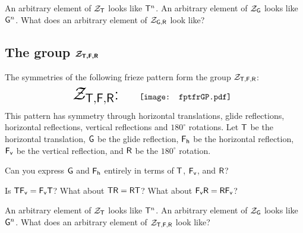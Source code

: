 \documentclass{ximera}
\begin{document}
\begin{question}
An arbitrary element of $\mathcal{Z}_\mathsf{T}$ looks like $\mathsf{T}^n$. An arbitrary
element of $\mathcal{Z}_\mathsf{G}$ looks like $\mathsf{G}^n$. What does an arbitrary element
of $\mathcal{Z}_{\mathsf{G},\mathsf{R}}$ look like?
\end{question}










\subsection{The group $\boldsymbol{\mathcal{Z}_{\mathsf{T},\mathsf{F},\mathsf{R}}}$}

The symmetries of the following frieze pattern form the group $\mathcal{Z}_{\mathsf{T},\mathsf{F},\mathsf{R}}$:
\[
\text{\huge $\Ztfr$:}\qquad\begin{array}{c}
\texttt{[image: fptfrGP.pdf]}
\end{array}
\]
This pattern has symmetry through horizontal translations, glide
reflections, horizontal reflections, vertical reflections and
$180^\circ$ rotations.  Let $\mathsf{T}$ be the horizontal translation,
$\mathsf{G}$ be the glide reflection, $\mathsf{F_h}$ be the horizontal
reflection, $\mathsf{F_v}$ be the vertical reflection, and $\mathsf{R}$ be
the $180^\circ$ rotation.


\begin{question} 
Can you express $\mathsf{G}$ and $\mathsf{F_h}$ entirely in terms of $\mathsf{T}$, $\mathsf{F_v}$, and $\mathsf{R}$?
\end{question}

\begin{question} 
Is $\mathsf{T}\mathsf{F_v} = \mathsf{F_v}\mathsf{T}$? What about $\mathsf{T}\mathsf{R} =
\mathsf{R}\mathsf{T}$? What about $\mathsf{F_v}\mathsf{R} = \mathsf{R}\mathsf{F_v}$?
\end{question}

\begin{question}
An arbitrary element of $\mathcal{Z}_\mathsf{T}$ looks like $\mathsf{T}^n$. An arbitrary
element of $\mathcal{Z}_\mathsf{G}$ looks like $\mathsf{G}^n$. What does an arbitrary element
of $\mathcal{Z}_{\mathsf{T},\mathsf{F},\mathsf{R}}$ look like?
\end{question}
\end{document}

